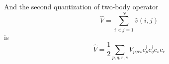 



And the second quantization of two-body operator
\begin{equation}
\hat{V}=\sum_{i<j=1}^{N} \hat{v}(i, j)
\end{equation}
is
\begin{equation}
\hat{V}=\frac{1}{2} \sum_{p, q, r, s} V_{p q r s} c_{p}^{\dagger} c_{q}^{\dagger} c_{s} c_{r}
\end{equation}



